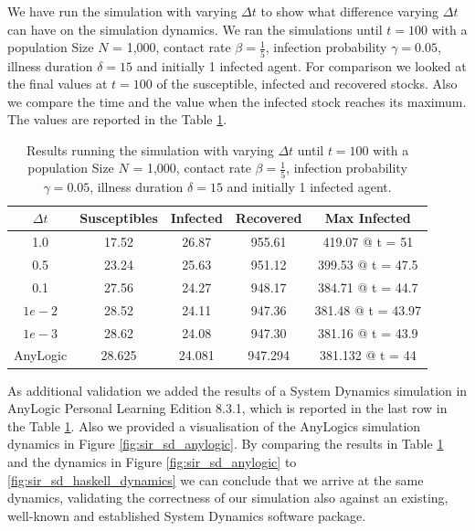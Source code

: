 We have run the simulation with varying $\Delta t$ to show what difference varying $\Delta t$ can have on the simulation dynamics. We ran the simulations until $t = 100$ with a population Size $N$ = 1,000, contact rate $\beta = \frac{1}{5}$, infection probability $\gamma = 0.05$, illness duration $\delta = 15$ and initially 1 infected agent. For comparison we looked at the final values at $t = 100$ of the susceptible, infected and recovered stocks. Also we compare the time and the value when the infected stock reaches its maximum. The values are reported in the Table \ref{tab:delta_influence}.

\begin{table}
  \centering
  \begin{tabular}{ c || c | c | c | c }
    $\Delta t$ & Susceptibles & Infected & Recovered & Max Infected \\ \hline \hline 
    1.0 & 17.52 & 26.87 & 955.61 & 419.07 @ t = 51 \\ \hline
    0.5 & 23.24 & 25.63 & 951.12 & 399.53 @ t = 47.5 \\ \hline
    0.1 & 27.56 & 24.27 & 948.17 & 384.71 @ t = 44.7 \\ \hline
    $1e-2$ & 28.52 & 24.11 & 947.36 & 381.48 @ t = 43.97 \\ \hline
    $1e-3$ & 28.62 & 24.08 & 947.30 & 381.16 @ t = 43.9  \\ \hline \hline
    AnyLogic & 28.625 & 24.081 & 947.294 & 381.132 @ t = 44
    
  \end{tabular}
  \caption{Results running the simulation with varying $\Delta t$ until $t = 100$ with a population Size $N$ = 1,000, contact rate $\beta = \frac{1}{5}$, infection probability $\gamma = 0.05$, illness duration $\delta = 15$ and initially 1 infected agent.}
  \label{tab:delta_influence}
\end{table}

As additional validation we added the results of a System Dynamics simulation in AnyLogic Personal Learning Edition 8.3.1, which is reported in the last row in the Table \ref{tab:delta_influence}. Also we provided a visualisation of the AnyLogics simulation dynamics in Figure \ref{fig:sir_sd_anylogic}. By comparing the results in Table \ref{tab:delta_influence} and the dynamics in Figure \ref{fig:sir_sd_anylogic} to \ref{fig:sir_sd_haskell_dynamics} we can conclude that we arrive at the same dynamics, validating the correctness of our simulation also against an existing, well-known and established System Dynamics software package.

